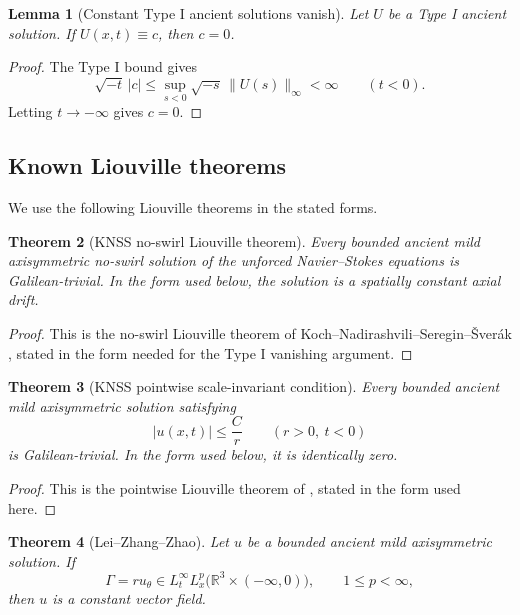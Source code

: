 \documentclass[11pt]{amsart}
\theoremstyle{plain}
\newtheorem{theorem}{Theorem}[section]
\newtheorem{lemma}[theorem]{Lemma}
\theoremstyle{definition}
\theoremstyle{remark}
\numberwithin{equation}{section}
\begin{document}
\begin{lemma}[Constant Type I ancient solutions vanish]
\label{lem:galilean-typeI-zero}
Let \(U\) be a Type I ancient solution.  If \(U(x,t)\equiv c\), then
\(c=0\).
\end{lemma}

\begin{proof}
The Type I bound gives
\[
   \sqrt{-t}\,|c|
   \le
   \sup_{s<0}\sqrt{-s}\,\|U(s)\|_\infty<\infty
   \qquad(t<0).
\]
Letting \(t\to-\infty\) gives \(c=0\).
\end{proof}

\subsection{Known Liouville theorems}

We use the following Liouville theorems in the stated forms.

\begin{theorem}[KNSS no-swirl Liouville theorem]
\label{thm:knss-noswirl}
Every bounded ancient mild axisymmetric no-swirl solution of the unforced
Navier--Stokes equations is Galilean-trivial.  In the form used below, the
solution is a spatially constant axial drift.
\end{theorem}

\begin{proof}
This is the no-swirl Liouville theorem of
Koch--Nadirashvili--Seregin--\v{S}ver\'ak \cite{KNSS2009}, stated in the form
needed for the Type I vanishing argument.
\end{proof}

\begin{theorem}[KNSS pointwise scale-invariant condition]
\label{thm:knss-pointwise}
Every bounded ancient mild axisymmetric solution satisfying
\[
   |u(x,t)|\le \frac{C}{r}
   \qquad(r>0,\ t<0)
\]
is Galilean-trivial.  In the form used below, it is identically zero.
\end{theorem}

\begin{proof}
This is the pointwise Liouville theorem of \cite{KNSS2009}, stated in the form
used here.
\end{proof}

\begin{theorem}[Lei--Zhang--Zhao]
\label{thm:lzz}
Let \(u\) be a bounded ancient mild axisymmetric solution.  If
\[
   \Gamma=ru_\theta\in L_t^\infty L_x^p
   \bigl(\mathbb R^3\times(-\infty,0)\bigr),
   \qquad 1\le p<\infty,
\]
then \(u\) is a constant vector field.
\end{theorem}
\end{document}
